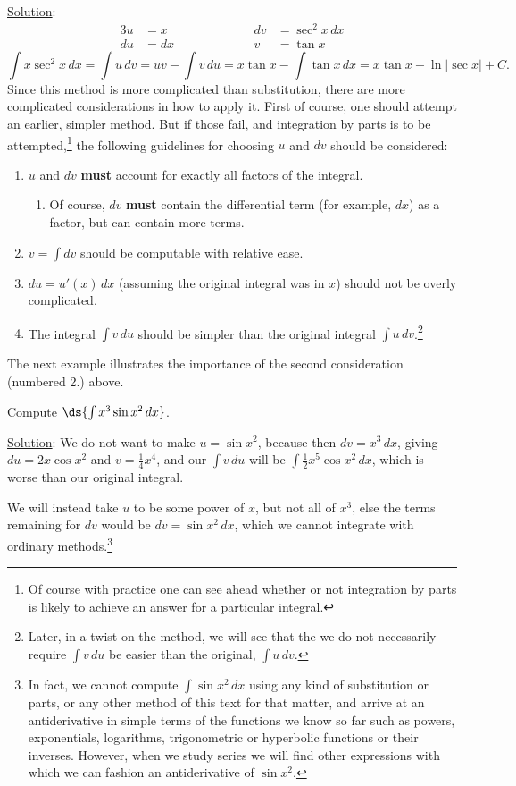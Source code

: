 \underline{Solution}:
\begin{alignat*}{3}
u&=x&&\qquad\qquad&dv&=\sec^2x\,dx\\
du&=dx&&&v&=\tan x
\end{alignat*}
$$
\int x\sec^2x\,dx =\int u\,dv
=uv-\int v\,du=x\tan x-\int\tan x\,dx=x\tan x-\ln|\sec x|+C.$$
\eex
Since this method is more complicated than substitution, there
are more complicated considerations in how to
apply it. First of course, one should attempt an
earlier, simpler method.  But if those fail, and integration
by parts is to be attempted,\footnote{%
Of course with practice one can see ahead whether or not integration by
parts is likely to achieve an answer for a particular integral.}
 the following guidelines for choosing $u$ and $dv$
should be considered:
\begin{enumerate}
\item $u$ and $dv$ {\bf must} account for exactly all factors of 
      the integral.
  \begin{enumerate}[1.5.]
  \item Of course, 
        $dv$ {\bf must} contain the differential term (for example, $dx$)
      as a factor,
      but can contain more terms.\end{enumerate}
\item $v=\int dv$ should be computable with relative ease.
\item $du=u'(x)\,dx$ (assuming the original integral was in $x$)
      should not be overly complicated.
\item The integral $\int v\,du$ should be simpler than the original
      integral $\int u\,dv$.\footnote{%
Later, in a twist on the method,
we will see that the we do not necessarily require
$\int v\,du$ be easier than the original,  $\int u\,dv$.%
}
\end{enumerate}
The next example illustrates the importance of the second consideration
(numbered 2.) above.

\newpage
\bex Compute $\ds{\int x^3\sin x^2\,dx}$.

\underline{Solution}: 
We  do not want to make $u=\sin x^2$, because 
then $dv=x^3\,dx$, giving $du=2x\cos x^2$ and $v=\frac14x^4$,
and our $\int v\,du$ will be $\int\frac12x^5\cos x^2\,dx$,
which is worse than our original integral.

We will instead take $u$ to be some power of $x$,
but not all of $x^3$, else the terms remaining for $dv$
would be $dv=\sin x^2\,dx$, which we cannot integrate with ordinary
methods.\footnote{%
In fact, we cannot compute $\int\sin x^2\,dx$ using any kind of
substitution or parts, or any other method of this text for that
matter, and arrive at an antiderivative in simple terms of the
functions we know so far such as powers, exponentials, logarithms,
trigonometric or hyperbolic functions or their inverses.  
However, when we
study series we will find other expressions with which we can
fashion an antiderivative of $\sin x^2$.%
}



